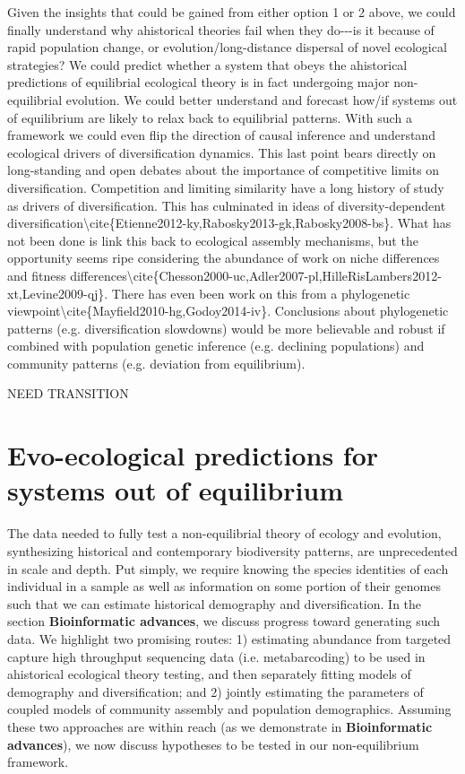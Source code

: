 \documentclass[]{article}
\begin{document}
Given the insights that could be gained from either option 1 or 2 above,
we could finally understand why ahistorical theories fail when they
do-\/-\/-is it because of rapid population change, or
evolution/long-distance dispersal of novel ecological strategies? We
could predict whether a system that obeys the ahistorical predictions of
equilibrial ecological theory is in fact undergoing major
non-equilibrial evolution. We could better understand and forecast
how/if systems out of equilibrium are likely to relax back to
equilibrial patterns. With such a framework we could even flip the
direction of causal inference and understand ecological drivers of
diversification dynamics. This last point bears directly on
long-standing and open debates about the importance of competitive
limits on diversification. Competition and limiting similarity have a
long history of study as drivers of diversification. This has culminated
in ideas of diversity-dependent
diversification\textbackslash{}cite\{Etienne2012-ky,Rabosky2013-gk,Rabosky2008-bs\}.
What has not been done is link this back to ecological assembly
mechanisms, but the opportunity seems ripe considering the abundance of
work on niche differences and fitness
differences\textbackslash{}cite\{Chesson2000-uc,Adler2007-pl,HilleRisLambers2012-xt,Levine2009-qj\}.
There has even been work on this from a phylogenetic
viewpoint\textbackslash{}cite\{Mayfield2010-hg,Godoy2014-iv\}.
Conclusions about phylogenetic patterns (e.g. diversification slowdowns)
would be more believable and robust if combined with population genetic
inference (e.g. declining populations) and community patterns (e.g.
deviation from equilibrium).

NEED TRANSITION

\section{Evo-ecological predictions for systems out of
equilibrium}\label{evo-ecological-predictions-for-systems-out-of-equilibrium}

The data needed to fully test a non-equilibrial theory of ecology and
evolution, synthesizing historical and contemporary biodiversity
patterns, are unprecedented in scale and depth. Put simply, we require
knowing the species identities of each individual in a sample as well as
information on some portion of their genomes such that we can estimate
historical demography and diversification. In the section
\textbf{Bioinformatic advances}, we discuss progress toward generating
such data. We highlight two promising routes: 1) estimating abundance
from targeted capture high throughput sequencing data (i.e.
metabarcoding) to be used in ahistorical ecological theory testing, and
then separately fitting models of demography and diversification; and 2)
jointly estimating the parameters of coupled models of community
assembly and population demographics. Assuming these two approaches are
within reach (as we demonstrate in \textbf{Bioinformatic advances}), we
now discuss hypotheses to be tested in our non-equilibrium framework.
\end{document}

